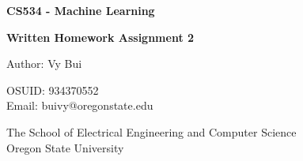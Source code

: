 \documentclass{article}
\begin{document}
\begin{titlepage}
    \begin{center}
        \vspace*{4cm}

        \textbf{\Large CS534 - Machine Learning}

        \vspace{0.5cm}
 
        \textbf{\Large Written Homework Assignment 2}
 
        \vspace{1cm}

        Author: Vy Bui

        OSUID: 934370552 \\ 
        
        Email: buivy@oregonstate.edu

        \vfill
             
        \vspace{0.8cm}
      
             
        The School of Electrical Engineering and Computer Science\\
        Oregon State University\\
             
    \end{center}
\end{titlepage}
\end{document}
